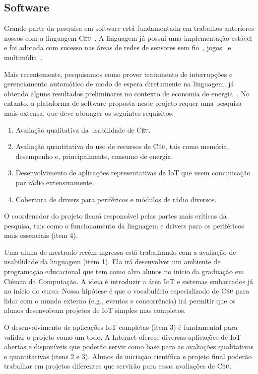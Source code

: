 \documentclass[titlepage,12pt]{article}
\newcommand{\CEU}{\textsc{C\'{e}u}\xspace}
\begin{document}
\subsection{Software}

Grande parte da pesquisa em software está fundamentada em trabalhos anteriores
nossos com a linguagem \CEU~\cite{ceu.sensys13,ceu.tecs17,ceu.lctes18}.
A linguagem já possui uma implementação estável e foi adotada com sucesso nas
áreas de redes de sensores sem fio~\cite{ceu.sensys13,ceu.terra},
jogos~\cite{ceu.mod15} e multimídia~\cite{ceumedia.webmedia16}.

Mais recentemente, pesquisamos como prover tratamento de interrupções e
gerenciamento automático de modo de espera diretamente na linguagem, já obtendo
alguns resultados preliminares no contexto de economia de
energia~\cite{ceu.lctes18.short}.
%
No entanto, a plataforma de software proposta neste projeto requer uma pesquisa
mais extensa, que deve abranger os seguintes requisitos:
%
\begin{enumerate}
\item Avaliação qualitativa da usabilidade de \CEU.
\item Avaliação quantitativa do uso de recursos de \CEU, tais como memória,
      desempenho e, principalmente, consumo de energia.
\item Desenvolvimento de aplicações representativas de IoT que usem comunicação
      por rádio extensivamente.
\item Cobertura de drivers para periféricos e módulos de rádio diversos.
\end{enumerate}

O coordenador do projeto ficará responsável pelas partes mais críticas da
pesquisa, tais como o funcionamento da linguagem e drivers para os periféricos
mais essenciais (item 4).

Uma aluna de mestrado recém ingressa está trabalhando com a avaliação de
usabilidade da linguagem (item 1).
Ela irá desenvolver um ambiente de programação educacional que tem como alvo
alunos no início da graduação em Ciência da Computação.
A ideia é introduzir a área IoT e sistemas embarcados já no início do curso.
Nossa hipótese é que o vocabulário especializado de \CEU para lidar com o mundo
externo (e.g., eventos e concorrência) irá permitir que os alunos desenvolvam
projetos de IoT simples mas completos.

O desenvolvimento de aplicações IoT completas (item 3) é fundamental para
validar o projeto como um todo.
A Internet oferece diversas aplicações de IoT abertas e disponíveis que poderão
servir como base para as avaliações qualitativas e quantitativas (itens 2 e 3).
Alunos de iniciação científica e projeto final poderão trabalhar em projetos
diferentes que servirão para essas avaliações de \CEU.
\end{document}
